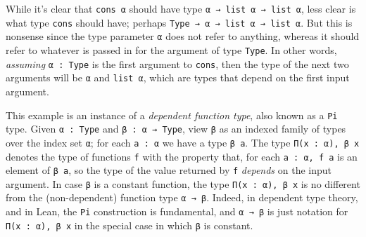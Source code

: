 \documentclass[11pt]{amsart}  %
\begin{document}
While it's clear that \lstinline{cons α} should have type \lstinline{α → list α → list α}, less clear is what type \lstinline{cons} should have; perhaps \lstinline{Type → α → list α → list α}. But this is nonsense since the type parameter \lstinline{α} does not refer to anything, whereas it should refer to whatever is passed in for the argument of type \lstinline{Type}. In other words, \emph{assuming} \lstinline{α : Type} is the first argument to \lstinline{cons}, then the type of the next two arguments will be \lstinline{α} and \lstinline{list α}, which are types that depend on the first input argument. 

This example is an instance of a \emph{dependent function type}, also known as a \lstinline{Pi} type. Given \lstinline{α : Type} and \lstinline{β : α → Type},
view \lstinline{β} as an indexed family of types over the index set \lstinline{α}; for each \lstinline{a : α} we have a type \lstinline{β a}.  The type \lstinline{Π(x : α), β x} denotes the type of functions \lstinline{f} with the property that, for each \lstinline{a : α, f a} is an element of \lstinline{β a}, so the type of the value returned by \lstinline{f} \emph{depends} on the input argument. In case \lstinline{β} is a constant function, the type \lstinline{Π(x : α), β x} is no different from the (non-dependent) function type \lstinline{α → β}. Indeed, in dependent type theory, and in Lean, the \lstinline{Pi} construction is fundamental, and \lstinline{α → β} is just notation for \lstinline{Π(x : α), β x} in the special case in which \lstinline{β} is constant.

\end{document}

